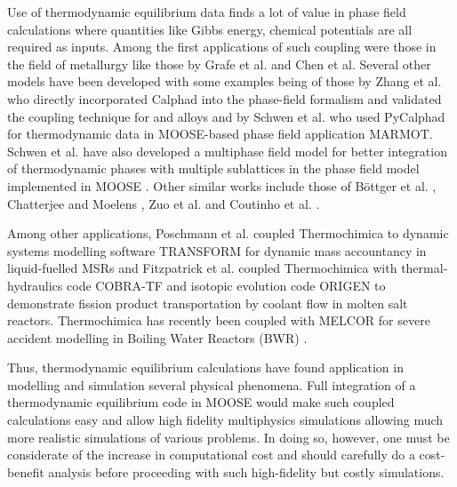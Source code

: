	Use of thermodynamic equilibrium data finds a lot of value in phase field calculations where quantities like Gibbs energy, chemical potentials are all required as inputs. Among the first applications of such coupling were those in the field of metallurgy like those by Grafe et al. \cite{Grafe:2000aa} and Chen et al. \cite{Chen:2005aa} Several other models have been developed with some examples being of those by Zhang et al. \cite{Zhang:2015aa} who directly incorporated Calphad into the phase-field formalism and validated the coupling technique for  and  alloys and by Schwen et al. \cite{Schwen:2017aa} who used PyCalphad for thermodynamic data in  MOOSE-based phase field application MARMOT. Schwen et al. have also developed a multiphase field model for better integration of thermodynamic phases with multiple sublattices in the phase field model implemented in MOOSE \cite{Schwen:2021aa}. Other similar works include those of B\"{o}ttger et al. \cite{Bottger:2020aa}, Chatterjee and Moelens \cite{Chatterjee:2021aa}, Zuo et al. \cite{Zuo:2021aa} and Coutinho et al. \cite{Coutinho:2022aa}.

	Among other applications, Poschmann et al. \cite{Poschmann:2022aa} coupled Thermochimica to dynamic systems modelling software TRANSFORM for dynamic mass accountancy in liquid-fuelled MSRs and  Fitzpatrick et al. \cite{Fitzpatrick18} coupled Thermochimica with thermal-hydraulics code COBRA-TF and isotopic evolution code ORIGEN to demonstrate fission product transportation by coolant flow in molten salt reactors. Thermochimica has recently been coupled with MELCOR for severe accident modelling in Boiling Water Reactors (BWR) \cite{Breeden:2022aa}.

	Thus, thermodynamic equilibrium calculations have found application in modelling and simulation several physical phenomena. Full integration of a thermodynamic equilibrium code in {MOOSE} would make such coupled calculations easy and allow high fidelity multiphysics simulations allowing much more realistic simulations of various problems. In doing so, however, one must be considerate of the increase in computational cost and should carefully do a cost-benefit analysis before proceeding with such high-fidelity but costly simulations.
